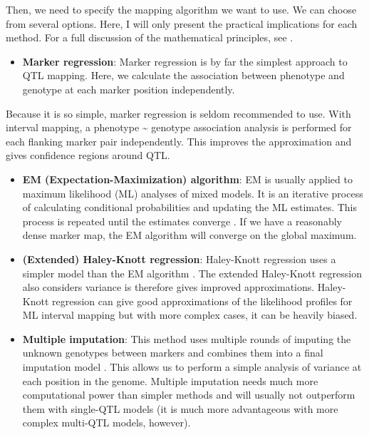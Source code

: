 \documentclass[12pt,]{krantz}
\providecommand{\tightlist}{%
  \setlength{\itemsep}{0pt}\setlength{\parskip}{0pt}}
\theoremstyle{definition}
\theoremstyle{definition}
\theoremstyle{remark}
\begin{document}
Then, we need to specify the mapping algorithm we want to use. We can
choose from several options. Here, I will only present the practical
implications for each method. For a full discussion of the mathematical
principles, see \citet{lynch1998genetics}.

\begin{itemize}
\tightlist
\item
  \textbf{Marker regression}: Marker regression is by far the simplest
  approach to QTL mapping. Here, we calculate the association between
  phenotype and genotype at each marker position independently.
\end{itemize}

Because it is so simple, marker regression is seldom recommended to use.
With interval mapping, a phenotype \textasciitilde{} genotype
association analysis is performed for each flanking marker pair
independently. This improves the approximation and gives confidence
regions around QTL.

\begin{itemize}
\tightlist
\item
  \textbf{EM (Expectation-Maximization) algorithm}: EM is usually
  applied to maximum likelihood (ML) analyses of mixed models. It is an
  iterative process of calculating conditional probabilities and
  updating the ML estimates. This process is repeated until the
  estimates converge \citep{Lander185}. If we have a reasonably dense
  marker map, the EM algorithm will converge on the global maximum.
\item
  \textbf{(Extended) Haley-Knott regression}: Haley-Knott regression
  uses a simpler model than the EM algorithm \citep{Haley1992}. The
  extended Haley-Knott regression also considers variance is therefore
  gives improved approximations. Haley-Knott regression can give good
  approximations of the likelihood profiles for ML interval mapping but
  with more complex cases, it can be heavily biased.
\item
  \textbf{Multiple imputation}: This method uses multiple rounds of
  imputing the unknown genotypes between markers and combines them into
  a final imputation model \citep{Sen371}. This allows us to perform a
  simple analysis of variance at each position in the genome. Multiple
  imputation needs much more computational power than simpler methods
  and will usually not outperform them with single-QTL models (it is
  much more advantageous with more complex multi-QTL models, however).
\end{itemize}
\end{document}
